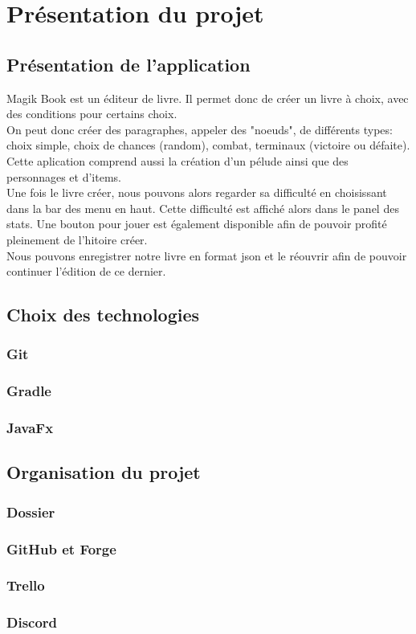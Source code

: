 \chapter{Présentation du projet}

	\section{Présentation de l'application}
        Magik Book est un éditeur de livre. Il permet donc de créer un livre à choix, avec des conditions pour certains choix.\\
        On peut donc créer des paragraphes, appeler des "noeuds", de différents types: choix simple, choix de chances (random), combat, terminaux (victoire ou défaite). Cette aplication comprend aussi la création d'un pélude ainsi que des personnages et d'items.\\
        Une fois le livre créer, nous pouvons alors regarder sa difficulté en choisissant dans la bar des menu en haut. Cette difficulté est affiché alors dans le panel des stats. Une bouton pour jouer est également disponible afin de pouvoir profité pleinement de l'hitoire créer.\\
        Nous pouvons enregistrer notre livre en format json et le réouvrir afin de pouvoir continuer l'édition de ce dernier.


	\section{Choix des technologies}

		\subsection{Git}


		\subsection{Gradle}



		\subsection{JavaFx}



	\section{Organisation du projet}



		\subsection{Dossier}



		\subsection{GitHub et Forge}



		\subsection{Trello}



		\subsection{Discord}
